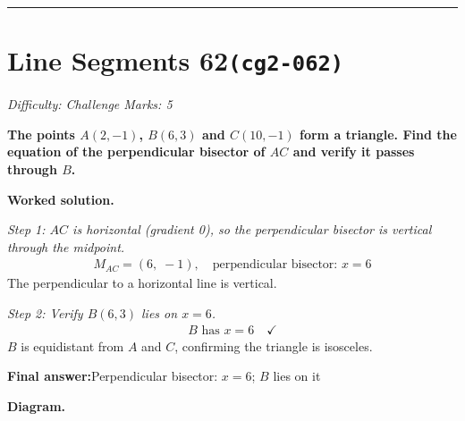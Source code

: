 \documentclass[11pt]{article}
\newcommand{\question}[1]{\par\medskip\noindent\textbf{#1}\par}
\begin{document}
\medskip\hrule

\section*{Line Segments 62\quad\small\texttt{(cg2-062)}}
\textit{Difficulty: Challenge \quad\textbar\quad Marks: 5}

\question{The points \( A(2, -1) \), \( B(6, 3) \) and \( C(10, -1) \) form a triangle. Find the equation of the perpendicular bisector of \( AC \) and verify it passes through \( B \).}

\textbf{Worked solution.}

\textit{Step 1: \(AC\) is horizontal (gradient 0), so the perpendicular bisector is vertical through the midpoint.}
\[\begin{gathered}
M_{AC} = (6,\; -1), \quad \text{perpendicular bisector: } x = 6
\end{gathered}\]
The perpendicular to a horizontal line is vertical.

\textit{Step 2: Verify \(B(6, 3)\) lies on \(x = 6\).}
\[\begin{gathered}
B \text{ has } x = 6 \quad \checkmark
\end{gathered}\]
\(B\) is equidistant from \(A\) and \(C\), confirming the triangle is isosceles.

\begin{answerbox}
\textbf{Final answer:}\quad Perpendicular bisector: \(\displaystyle x = 6\); \(\displaystyle B\) lies on it
\end{answerbox}
\textbf{Diagram.}
\end{document}
